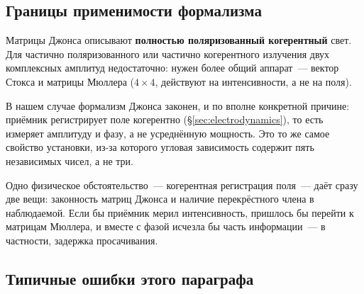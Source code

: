 \subsection{Границы применимости формализма}
\label{subsec:limits}

\begin{strict}
Матрицы Джонса описывают \textbf{полностью поляризованный когерентный} свет. Для частично
поляризованного или частично когерентного излучения двух комплексных амплитуд недостаточно:
нужен более общий аппарат~--- вектор Стокса и матрицы Мюллера ($4\times4$, действуют на
интенсивности, а не на поля).
\end{strict}

\noindent
В нашем случае формализм Джонса законен, и по вполне конкретной причине: приёмник регистрирует
поле когерентно (§\ref{sec:electrodynamics}), то есть измеряет амплитуду и фазу, а не усреднённую
мощность. Это то же самое свойство установки, из-за которого угловая зависимость содержит пять
независимых чисел, а не три.

\begin{intuition}
Одно физическое обстоятельство~--- когерентная регистрация поля~--- даёт сразу две вещи:
законность матриц Джонса и наличие перекрёстного члена в наблюдаемой. Если бы приёмник мерил
интенсивность, пришлось бы перейти к матрицам Мюллера, и вместе с фазой исчезла бы часть
информации~--- в частности, задержка просачивания.
\end{intuition}

\subsection{Типичные ошибки этого параграфа}

